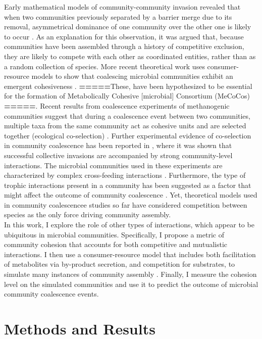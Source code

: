 \documentclass[titlepage,11pt]{article}
\begin{document}
\begin{linenumbers}
			Early mathematical models of community-community invasion revealed that when two communities previously separated by a barrier merge due to its removal, asymmetrical dominance of one community over the other one is likely to occur \citep{Gilpin1994, Toquenaga1997}. As an explanation for this observation, it was argued that, because communities have been assembled through a history of competitive exclusion, they are likely to compete with each other as coordinated entities, rather than as a random collection of species. More recent theoretical work uses consumer-resource models to show that coalescing microbial communities exhibit an emergent cohesiveness \citep{Tikhonov2016, Tikhonov2017}. \textbf{=====}These, have been hypothesized to be essential for the formation of Metabolically Cohesive [microbial] Consortium (MeCoCos) \citep{Pascual-Garcia2020}\textbf{=====}. Recent results from coalescence experiments of methanogenic communities suggest that during a coalescence event between two communities, multiple taxa from the same community act as cohesive units and are selected together (ecological co-selection) \citep{Sierocinski2017}. Further experimental evidence of co-selection in community coalescence has been reported in \citet{Lu2018}, where it was shown that successful collective invasions are accompanied by strong community-level interactions. The microbial communities used in these experiments are characterized by complex cross-feeding interactions \citep{Hansen2007, Lawrence2012, Embree2015}. Furthermore, the type of trophic interactions present in a community has been suggested as a factor that might affect the outcome of community coalescence \citep{Castledine2020}.  Yet, theoretical models used in community coalescencee studies so far have considered competition between species as the only force driving community assembly.\\
			In this work, I explore the role of other types of interactions, which appear to be ubiquitous in microbial communities. Specifically, I propose a metric of community cohesion that accounts for both competitive and mutualistic interactions. I then use a consumer-resource model that includes both facilitation of metabolites via by-product secretion, and competition for substrates, to simulate many instances of community assembly . Finally, I measure the cohesion level on the simulated communities and use it to predict the outcome of microbial community coalescence events. 
		\section{Methods and Results}

\end{linenumbers}
\end{document}
